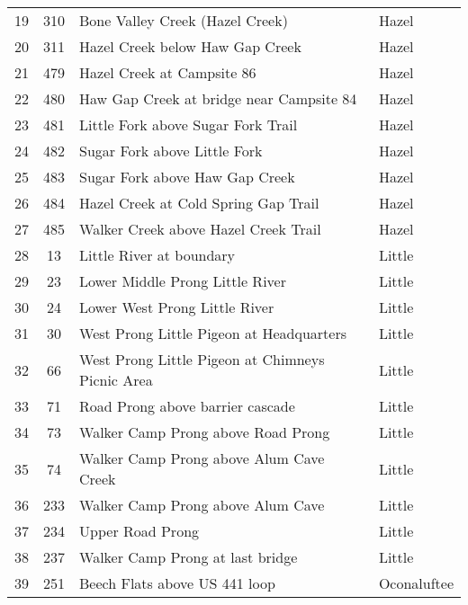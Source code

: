 \begin{table}[h]
\begin{flushleft}
\begin{tabular}{ccll}
19 & 310       & Bone Valley Creek (Hazel Creek)                            & Hazel \\ 
20 & 311       & Hazel Creek below Haw Gap Creek                        & Hazel \\ 
21 & 479       & Hazel Creek at Campsite 86                                   & Hazel \\ 
22 & 480       & Haw Gap Creek at bridge near Campsite 84          & Hazel \\ 
23 & 481       & Little Fork above Sugar Fork Trail                           & Hazel \\ 
24 & 482       & Sugar Fork above Little Fork                                  & Hazel \\  
25 & 483       & Sugar Fork above Haw Gap Creek                         & Hazel \\ 
26 & 484       & Hazel Creek at Cold Spring Gap Trail                      & Hazel \\ 
27 & 485       & Walker Creek above Hazel Creek Trail                   & Hazel \\ 
28 & 13         & Little River at boundary                                         & Little \\ 
29 & 23         & Lower Middle Prong Little River                              & Little \\ 
30 & 24         & Lower West Prong Little River                                & Little \\ 
31 & 30         & West Prong Little Pigeon at Headquarters             & Little\\ 
32 & 66         & West Prong Little Pigeon at Chimneys Picnic Area & Little \\ 
33 & 71         & Road Prong above barrier cascade                        & Little \\ 
34 & 73         & Walker Camp Prong above Road Prong                 & Little \\ 
35 & 74         & Walker Camp Prong above Alum Cave Creek        & Little \\ 
36 & 233       & Walker Camp Prong above Alum Cave                  & Little \\ 
37 & 234       & Upper Road Prong                                                 & Little \\ 
38 & 237       & Walker Camp Prong at last bridge                         & Little \\ 
39 & 251       & Beech Flats above US 441 loop                             & Oconaluftee \\ 

\end{tabular}
\end{flushleft}
\end{table}
